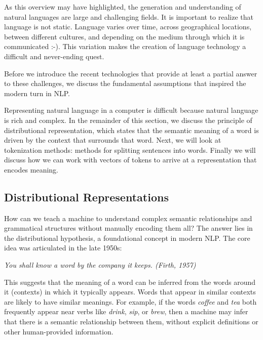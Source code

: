 As this overview may have highlighted, the generation and understanding of natural languages are large and challenging fields. It is  important to realize that language is not static. Language varies over time, across geographical locations, between different cultures, and depending on the medium through which it is communicated :-). %
This variation makes the creation of language technology a difficult and never-ending quest. 

Before we introduce the recent technologies that provide at least a partial answer to these challenges, we discuss the fundamental assumptions that inspired the modern turn in NLP.

Representing natural language in a computer is difficult because natural language is rich and complex. In the remainder of this section, we discuss the principle of distributional representation, which states that the semantic meaning of a word is driven by the context that surrounds that word. Next, we will look at tokenization methods: methods for splitting sentences into words. Finally we will discuss how we can work with vectors of tokens to arrive at a representation that encodes meaning. 

\subsection{Distributional Representations} 
How can we teach a machine to understand  complex semantic relationships and grammatical structures without manually encoding them all?  The answer lies in the distributional hypothesis, a foundational concept in modern NLP. The core idea was articulated in the late 1950s:
\begin{center}
    \emph{You shall know a word by the company it keeps. (Firth, 1957)}
\end{center} 
%
This suggests that the meaning of a word can be inferred from the words around it (contexts) in which it typically appears. Words that appear in similar contexts are likely to have similar meanings. For example, if the words {\em coffee} and {\em tea} both frequently appear near verbs like {\em drink}, {\em sip}, or {\em brew}, then a machine may infer that there is a semantic relationship between them,  without explicit definitions or other human-provided information. 

